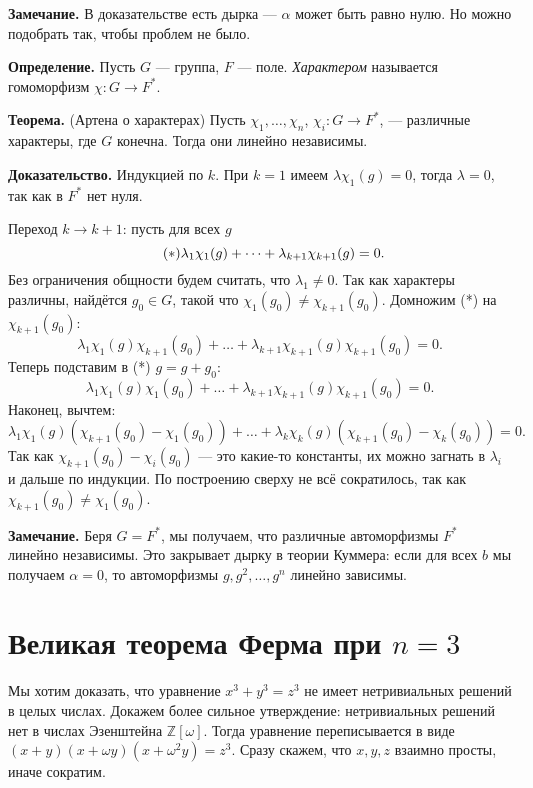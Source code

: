 \QED

\textbf{Замечание.} В доказательстве есть дырка --- $\alpha$ может быть равно нулю.
Но можно подобрать так, чтобы проблем не было.

\textbf{Определение.} Пусть $G$ --- группа, $F$ --- поле. \textit{Характером} называется гомоморфизм $\chi: G \to F^*$.

\textbf{Теорема.} (Артена о характерах) Пусть $\chi_1, \dots, \chi_n$, $\chi_i: G \to F^*$, --- различные характеры, где $G$ конечна. Тогда они линейно независимы.

\textbf{Доказательство.} Индукцией по $k$. При $k = 1$ имеем $\lambda \chi_1(g) = 0$, тогда $\lambda = 0$, так как в $F^*$ нет нуля.

Переход $k \to k + 1$: пусть для всех $g$
\[
    \tag{$*$}
    \lambda_1 \chi_1(g) + \dots + \lambda_{k+1} \chi_{k+1}(g) = 0. \hfill 
\]
Без ограничения общности будем считать, что $\lambda_1 \ne 0$.
Так как характеры различны, найдётся $g_0 \in G$, такой что $\chi_1(g_0) \ne \chi_{k+1}(g_0)$.
Домножим (*) на $\chi_{k+1}(g_0)$:
\[
    \lambda_1 \chi_1(g) \chi_{k+1}(g_0) + \dots + \lambda_{k+1} \chi_{k+1}(g) \chi_{k+1}(g_0) = 0.
\]
Теперь подставим в (*) $g = g + g_0$:
\[
    \lambda_1 \chi_1(g) \chi_1(g_0) + \dots + \lambda_{k+1} \chi_{k+1}(g) \chi_{k+1}(g_0) = 0.
\]
Наконец, вычтем:
\[
    \lambda_1 \chi_1(g)(\chi_{k+1}(g_0) - \chi_1(g_0)) + \dots + \lambda_k \chi_k(g)(\chi_{k+1}(g_0) - \chi_k(g_0)) = 0.
\]
Так как $\chi_{k+1}(g_0) - \chi_i(g_0)$ --- это какие-то константы, их можно загнать в $\lambda_i$ и дальше по индукции.
По построению сверху не всё сократилось, так как $\chi_{k+1}(g_0) \ne \chi_1(g_0)$.

\QED

\textbf{Замечание.} Беря $G = F^*$, мы получаем, что различные автоморфизмы $F^*$ линейно независимы.
Это закрывает дырку в теории Куммера: если для всех $b$ мы получаем $\alpha = 0$, то автоморфизмы $g, g^2, \dots, g^n$ линейно зависимы.

\section{Великая теорема Ферма при $n = 3$}
Мы хотим доказать, что уравнение $x^3 + y^3 = z^3$ не имеет нетривиальных решений в целых числах.
Докажем более сильное утверждение: нетривиальных решений нет в числах Эзенштейна $\mathbb Z[\omega]$.
Тогда уравнение переписывается в виде $(x + y)(x + \omega y)(x + \omega^2 y) = z^3$.
Сразу скажем, что $x, y, z$ взаимно просты, иначе сократим.

